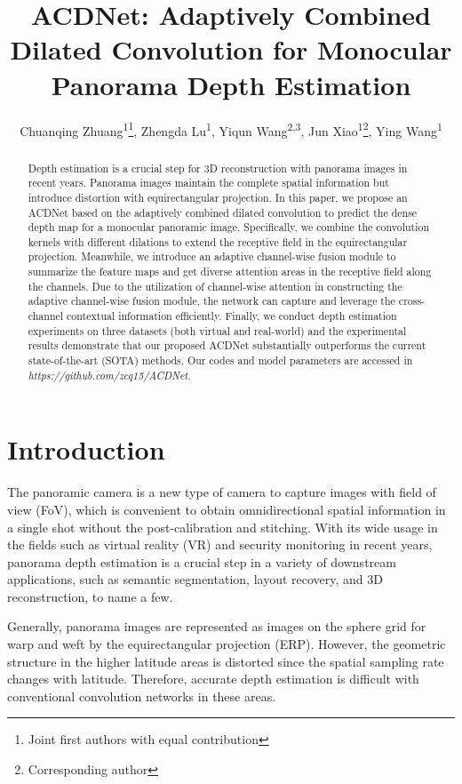 \documentclass[letterpaper]{article} \usepackage{aaai21}  \usepackage{times}  \usepackage{helvet} \usepackage{courier}  \usepackage[hyphens]{url}  \usepackage{graphicx} \urlstyle{rm} \def\UrlFont{\rm}  \usepackage{natbib}  \usepackage{caption} \frenchspacing  \setlength{\pdfpagewidth}{8.5in}  \setlength{\pdfpageheight}{11in}
\title{ACDNet: Adaptively Combined Dilated Convolution for Monocular Panorama Depth Estimation}
\author {
    Chuanqing Zhuang\textsuperscript{\rm 1}\footnote{Joint first authors with equal contribution},
    Zhengda Lu\textsuperscript{\rm 1}\footnotemark[1],
    Yiqun Wang\textsuperscript{\rm 2,3},
    Jun Xiao\textsuperscript{\rm 1}\footnote{Corresponding author},
    Ying Wang\textsuperscript{\rm 1}\\
}
\begin{document}
\maketitle

\begin{abstract}
Depth estimation is a crucial step for 3D reconstruction with panorama images in recent years. Panorama images maintain the complete spatial information but introduce distortion with equirectangular projection. In this paper, we propose an ACDNet based on the adaptively combined dilated convolution to predict the dense depth map for a monocular panoramic image. Specifically, we combine the convolution kernels with different dilations to extend the receptive field in the equirectangular projection. Meanwhile, we introduce an adaptive channel-wise fusion module to summarize the feature maps and get diverse attention areas in the receptive field along the channels. Due to the utilization of channel-wise attention in constructing the adaptive channel-wise fusion module, the network can capture and leverage the cross-channel contextual information efficiently. Finally, we conduct depth estimation experiments on three datasets (both virtual and real-world) and the experimental results demonstrate that our proposed ACDNet substantially outperforms the current state-of-the-art (SOTA) methods. Our codes and model parameters are accessed in \textit{https://github.com/zcq15/ACDNet}.

\end{abstract}

\section{Introduction}

The panoramic camera is a new type of camera to capture images with  field of view (FoV), which is convenient to obtain omnidirectional spatial information in a single shot without the post-calibration and stitching. 
With its wide usage in the fields such as virtual reality (VR) and security monitoring in recent years,
panorama depth estimation is a crucial step in a variety of downstream applications, such as semantic segmentation, layout recovery, and 3D reconstruction, to name a few. 

Generally, panorama images are represented as images on the sphere grid for warp and weft by the equirectangular projection (ERP). However, the geometric structure in the higher latitude areas is distorted since the spatial sampling rate changes with latitude.
Therefore, accurate depth estimation is difficult with conventional convolution networks in these areas.
\end{document}
